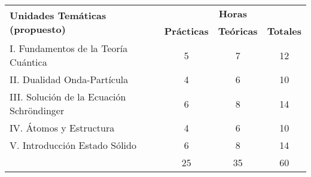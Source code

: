\begin{tabular}{|p{9.5cm}|c|c|c|}
	\hline
	\multirow{2}{*}{\textbf{Unidades Temáticas (propuesto)}} & \multicolumn{3}{c}{\textbf{Horas}} \\
	
	
	& \textbf{Prácticas} & \textbf{Teóricas} & \textbf{Totales} \\
	\hline
	I. Fundamentos de la Teoría Cuántica	& 5 & 7 & 12\\
	\hline
	II. Dualidad Onda-Partícula & 4 & 6 & 10 \\
	\hline
	III. Solución de la Ecuación Schröndinger & 6 & 8 & 14 \\
	\hline
	IV. Átomos y Estructura  & 4 & 6 & 10 \\
	\hline
	V. Introducción Estado Sólido & 6 & 8 & 14 \\
	\hline
	& 25 & 35 & 60 \\
	\hline
	
\end{tabular}